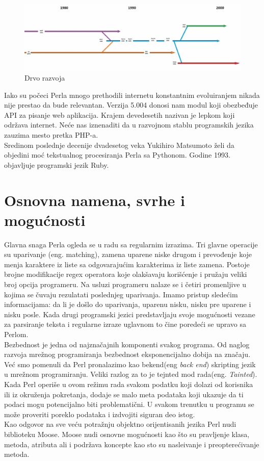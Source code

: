 \documentclass[a4paper]{article}
\begin{document}
\begin{figure}[H]
\centering
\includegraphics[scale=0.23]{drvorazvoja.jpg}
\caption{Drvo razvoja}
\end{figure}
Iako su počeci Perla mnogo prethodili internetu konstantnim evoluiranjem nikada nije prestao da bude relevantan. Verzija 5.004 donosi nam modul koji obezbeđuje API za pisanje web aplikacija. Krajem devedesetih nazivan je lepkom koji održava internet. Neće nas iznenaditi da u razvojnom stablu programskih jezika zauzima mesto pretka PHP-a.\\
Sredinom poslednje decenije dvadesetog veka Yukihiro Matsumoto želi da objedini moć tekstualnog procesiranja Perla sa Pythonom. Godine 1993. objavljuje programski jezik Ruby.



\section{Osnovna namena, svrhe i mogu\'cnosti}
\label{sec:namena}

Glavna snaga Perla ogleda se u radu sa regularnim izrazima. Tri glavne operacije su uparivanje (eng. matching), zamena uparene niske drugom i prevođenje koje menja karaktere iz liste sa odgovarajućim karakterima iz liste zamena.\cite{id} Postoje brojne modifikacije regex operatora koje olakšavaju korišćenje i pružaju veliki broj opcija programeru. Na usluzi programeru nalaze se i četiri promenljive u kojima se čuvaju rezulatati poslednjeg uparivanja. Imamo pristup sledećim informacijama: da li je došlo do uparivanja, uparenu nisku, nisku pre uparene i nisku posle\cite{friedl2006mastering}. Kada drugi programski jezici predstavljaju svoje mogućnosti vezane za parsiranje teksta i regularne izraze uglavnom to čine poredeći se upravo sa Perlom.\\
Bezbednost je jedna od najznačajnih komponenti svakog programa. Od naglog razvoja mrežnog programiranja bezbednost eksponencijalno dobija na značaju. Već smo pomenuli da Perl pronalazimo kao bekend(eng {\em back end}) skripting jezik u mrežnom programiranju. Veliki razlog za to je tejnted mod rada(eng. {\em Tainted}). Kada Perl operiše u ovom režimu rada svakom podatku koji dolazi od korisnika ili iz okruženja pokretanja, dodaje se malo meta podataka koji ukazuje da ti podaci mogu potencijalno biti problematični. U svakom trenutku u programu se mo\v ze proveriti poreklo podataka i izdvojiti siguran deo istog\cite{modern}.\\
Kao odgovor na sve veću potražnju objektno orijentisanih jezika Perl nudi biblioteku Moose. Moose nudi osnovne mogu\'cnosti kao \v sto su pravljenje klasa, metoda, atributa ali i podržava koncepte kao sto su nasle\dj{}ivanje i preopterećivanje metoda. 
\end{document}
